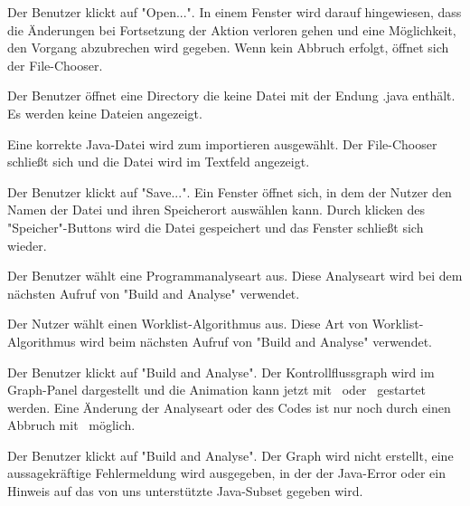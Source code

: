 {Der Benutzer klickt auf "Open...".}
{In einem Fenster wird darauf hingewiesen, dass die Änderungen bei Fortsetzung der Aktion verloren gehen und eine Möglichkeit, den Vorgang abzubrechen wird gegeben. Wenn kein Abbruch erfolgt, öffnet sich der File-Chooser.}

{Der Benutzer öffnet eine Directory die keine Datei mit der Endung .java enthält.}
{Es werden keine Dateien angezeigt.}

{Eine korrekte Java-Datei wird zum importieren ausgewählt.}
{Der File-Chooser schließt sich und die Datei wird im Textfeld angezeigt.}

{Der Benutzer klickt auf "Save...".}
{Ein Fenster öffnet sich, in dem der Nutzer den Namen der Datei und ihren Speicherort auswählen kann. Durch klicken des "Speicher"-Buttons wird die Datei gespeichert und das Fenster schließt sich wieder.}


\tests{}

{Der Benutzer wählt eine Programmanalyseart aus.}
{Diese Analyseart wird bei dem nächsten Aufruf von "Build and Analyse" verwendet.}

{Der Nutzer wählt einen Worklist-Algorithmus aus.}
{Diese Art von Worklist-Algorithmus wird beim nächsten Aufruf von "Build and Analyse" verwendet.}


\tests{}

{Der Benutzer klickt auf "Build and Analyse".}
{Der Kontrollflussgraph wird im Graph-Panel dargestellt und die Animation kann jetzt mit \faStepForward\ oder \faPlay\ gestartet werden. Eine Änderung der Analyseart oder des Codes ist nur noch durch einen Abbruch mit \faStop\ möglich.}

{Der Benutzer klickt auf "Build and Analyse".}
{Der Graph wird nicht erstellt, eine aussagekräftige Fehlermeldung wird ausgegeben, in der der Java-Error oder ein Hinweis auf das von uns unterstützte Java-Subset gegeben wird.}

